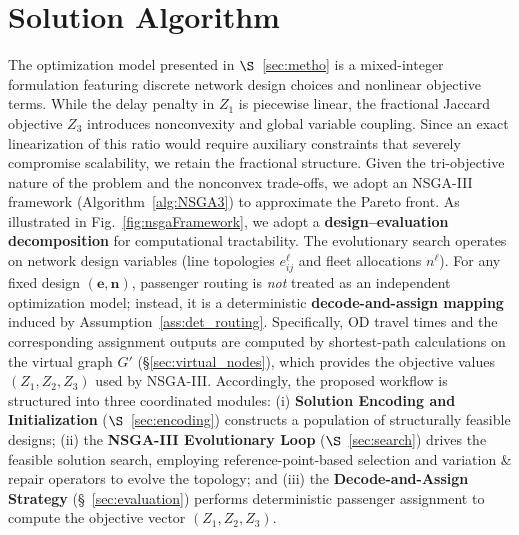 \documentclass[a4paper,fleqn]{cas-sc}
\begin{document}
\section{Solution Algorithm}\label{sec:alg}
The optimization model presented in $\S$~\ref{sec:metho} is a mixed-integer formulation featuring discrete network design choices and nonlinear objective terms.
While the delay penalty in $Z_1$ is piecewise linear, the fractional Jaccard objective $Z_3$ introduces nonconvexity and global variable coupling.
Since an exact linearization of this ratio would require auxiliary constraints that severely compromise scalability, we retain the fractional structure.
%
Given the tri-objective nature of the problem and the nonconvex trade-offs, we adopt an NSGA-III framework (Algorithm~\ref{alg:NSGA3}) to approximate the Pareto front.
%
As illustrated in Fig.~\ref{fig:nsgaFramework}, we adopt a \textbf{design--evaluation decomposition} for computational tractability.
The evolutionary search operates on network design variables (line topologies $e_{ij}^\ell$ and fleet allocations $n^\ell$).
For any fixed design $(\mathbf e,\mathbf n)$, passenger routing is \emph{not} treated as an independent optimization model; instead, it is a deterministic \textbf{decode-and-assign mapping} induced by Assumption~\ref{ass:det_routing}.
Specifically, OD travel times and the corresponding assignment outputs are computed by shortest-path calculations on the virtual graph $G'$ (\S\ref{sec:virtual_nodes}), which provides the objective values $(Z_1,Z_2,Z_3)$ used by NSGA-III.
%
Accordingly, the proposed workflow is structured into three coordinated modules:
(i) \textbf{Solution Encoding and Initialization} ($\S$~\ref{sec:encoding}) constructs a population of structurally feasible designs;
(ii) the \textbf{NSGA-III Evolutionary Loop} ($\S$~\ref{sec:search}) drives the feasible solution search, employing reference-point-based selection and variation \& repair operators to evolve the topology; and
(iii) the \textbf{Decode-and-Assign Strategy} (\S~\ref{sec:evaluation}) performs deterministic passenger assignment to compute the objective vector $(Z_1, Z_2, Z_3)$.
\end{document}
